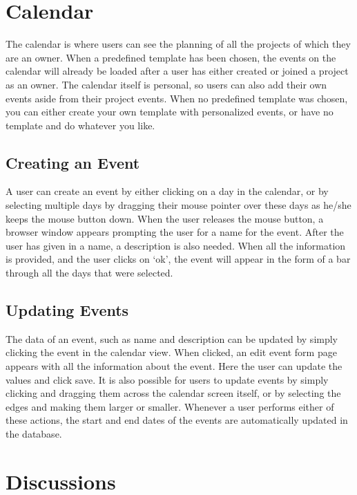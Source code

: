 \section{Calendar}

The calendar is where users can see the planning of all the projects of which they are an owner. When a predefined template has been chosen, the events on the calendar will already be loaded after a user has either created or joined a project as an owner. The calendar itself is personal, so users can also add their own events aside from their project events. When no predefined template was chosen, you can either create your own template with personalized events, or have no template and do whatever you like.

\subsection{Creating an Event}

A user can create an event by either clicking on a day in the calendar, or by selecting multiple days by dragging their mouse pointer over these days as he/she keeps the mouse button down. When the user releases the mouse button, a browser window appears prompting the user for a name for the event. After the user has given in a name, a description is also needed. When all the information is provided, and the user clicks on `ok', the event will appear in the form of a bar through all the days that were selected.

\subsection{Updating Events}

The data of an event, such as name and description can be updated by simply clicking the event in the calendar view. When clicked, an edit event form page appears with all the information about the event. Here the user can update the values and click save. It is also possible for users to update events by simply clicking and dragging them across the calendar screen itself, or by selecting the edges and making them larger or smaller. Whenever a user performs either of these actions, the start and end dates of the events are automatically updated in the database.
\newpage
\section{Discussions}

